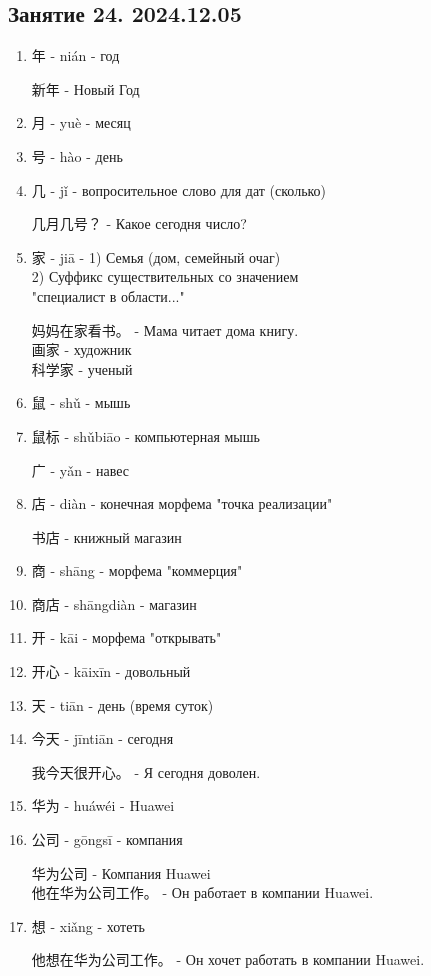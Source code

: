 \LARGE
\newpage
\subsection{Занятие 24. 2024.12.05}
\begin{newwords}
	\begin{enumerate}\hfill
		\item 年 - nián - год
		\begin{example}
			新年 - Новый Год
		\end{example}
		\item 月 - yuè - месяц
		\item 号 - hào - день
		\item 几 - jǐ - вопросительное слово для дат (сколько)
		\begin{example}
			几月几号？ - Какое сегодня число?
		\end{example}
		\item 家 - jiā - 1) Семья (дом, семейный очаг)\\
		2) Суффикс существительных со значением\\
		"специалист в области..."
		\begin{example}\hfill\break
			妈妈在家看书。 - Мама читает дома книгу.\\
			画家 - художник\\
			科学家 - ученый
		\end{example}
		\item 鼠 - shǔ - мышь
		\item 鼠标 - shǔbiāo - компьютерная мышь
		\begin{newgraphem}
			广 - yǎn - навес
		\end{newgraphem}
		\item 店 - diàn - конечная морфема "точка реализации"
		\begin{example}
			书店 - книжный магазин
		\end{example}
		\item 商 - shāng - морфема "коммерция"
		\item 商店 - shāngdiàn - магазин
		\item 开 - kāi - морфема "открывать"
		\item 开心 - kāixīn - довольный
		\item 天 - tiān - день (время суток)
		\item 今天 - jīntiān - сегодня
		\begin{example}
			我今天很开心。 - Я сегодня доволен.
		\end{example}
		\item 华为 - huáwéi - Huawei
		\item 公司 - gōngsī - компания
		\begin{example}\hfill\break
			华为公司 - Компания Huawei\\
			他在华为公司工作。 - Он работает в компании Huawei.
		\end{example}
		\item 想 - xiǎng - хотеть
		\begin{example}
			他想在华为公司工作。 - Он хочет работать в компании Huawei.
		\end{example}
	\end{enumerate}
\end{newwords}
